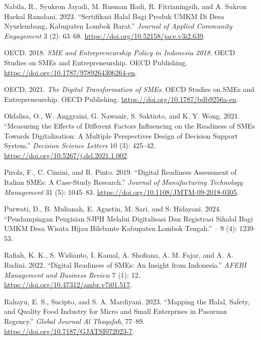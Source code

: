 \documentclass[
  default,
]{sn-jnl}
\newlength{\cslhangindent}
\newenvironment{CSLReferences}[2] %
 {\begin{list}{}{%
  \setlength{\itemindent}{0pt}
  \setlength{\leftmargin}{0pt}
  \setlength{\parsep}{0pt}
  \ifodd #1
   \setlength{\leftmargin}{\cslhangindent}
   \setlength{\itemindent}{-1\cslhangindent}
  \fi
  \setlength{\itemsep}{#2\baselineskip}}}
 {\end{list}}
\begin{document}
\begin{CSLReferences}{1}{1}
Nabila, R., Syukron Jayadi, M. Rusman Hadi, R. Fitrianingsih, and A.
Sukron Haekal Ramdani. 2023. {``Sertifikasi Halal Bagi Produk UMKM Di
Desa Nyurlembang, Kabupaten Lombok Barat.''} \emph{Journal of Applied
Community Engagement} 3 (2): 63--68.
\url{https://doi.org/10.52158/jace.v3i2.639}.

OECD. 2018. \emph{SME and Entrepreneurship Policy in Indonesia 2018}.
OECD Studies on SMEs and Entrepreneurship. OECD Publishing.
\url{https://doi.org/10.1787/9789264306264-en}.

OECD. 2021. \emph{The Digital Transformation of SMEs}. OECD Studies on
SMEs and Entrepreneurship. OECD Publishing.
\url{https://doi.org/10.1787/bdb9256a-en}.

Okfalisa, O., W. Anggraini, G. Nawanir, S. Saktioto, and K. Y. Wong.
2021. {``Measuring the Effects of Different Factors Influencing on the
Readiness of SMEs Towards Digitalization: A Multiple Perspectives Design
of Decision Support System.''} \emph{Decision Science Letters} 10 (3):
425--42. \url{https://doi.org/10.5267/j.dsl.2021.1.002}.

Pirola, F., C. Cimini, and R. Pinto. 2019. {``Digital Readiness
Assessment of Italian SMEs: A Case-Study Research.''} \emph{Journal of
Manufacturing Technology Management} 31 (5): 1045--83.
\url{https://doi.org/10.1108/JMTM-09-2018-0305}.

Purwati, D., B. Mulianah, E. Agustin, M. Sari, and S. Hidayani. 2024.
{``Pendampingan Pengisian SJPH Melalui Digitalisasi Dan Registrasi
Sihalal Bagi UMKM Desa Wisata Hijau Bilebante Kabupaten Lombok
Tengah.''} \emph{--} 9 (4): 1239--53.

Rafiah, K. K., S. Widianto, I. Kamal, A. Shofiana, A. M. Fajar, and A.
A. Rudini. 2022. {``Digital Readiness of SMEs: An Insight from
Indonesia.''} \emph{AFEBI Management and Business Review} 7 (1): 12.
\url{https://doi.org/10.47312/ambr.v7i01.517}.

Rahayu, E. S., Sucipto, and S. A. Mardiyani. 2023. {``Mapping the Halal,
Safety, and Quality Food Industry for Micro and Small Enterprises in
Pasuruan Regency.''} \emph{Global Journal Al Thaqafah}, 77--89.
\url{https://doi.org/10.7187/GJATSI072023-7}.


\end{CSLReferences}
\end{document}
